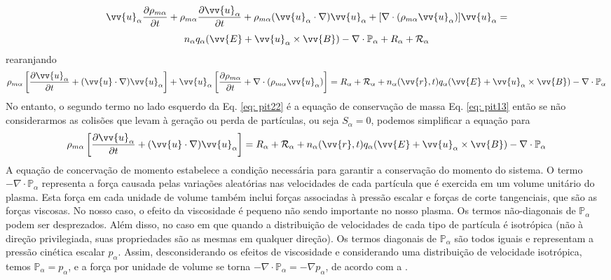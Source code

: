 \documentclass[12pt,oneside,a4paper]{abntex2}
\begin{document}
\begin{equation}
\label{eq: pit21}
 \vv{u}_\alpha \frac{\partial \rho_{m\alpha}}{\partial t} + \rho_{m\alpha} \frac{\partial \vv{u}_\alpha}{\partial t}+ \rho_{m\alpha} (\vv{u}_\alpha \cdot \nabla)\vv{u}_\alpha+[\nabla \cdot (\rho_{m\alpha} \vv{u}_\alpha)]\vv{u}_\alpha  =
\end{equation}
\begin{equation*}
n_\alpha q_\alpha (\vv{E} + \vv{u}_\alpha \times \vv{B})-\nabla \cdot \mathbb{P}_\alpha + R_\alpha + \mathcal{R}_\alpha
\end{equation*}
rearanjando
\begin{equation}
\label{eq: pit22}
\rho_{m\alpha} \left[\frac{\partial \vv{u}_\alpha}{\partial t} + (\vv{u} \cdot \nabla)\vv{u}_\alpha \right]+ \vv{u}_\alpha \left[ \frac{\partial \rho_{m\alpha}}{\partial t} + \nabla \cdot (\rho_{m\alpha} \vv{u}_\alpha)  \right] = R_\alpha + \mathcal{R}_\alpha +n_\alpha(\vv{r},t) q_\alpha (\vv{E} + \vv{u}_\alpha \times \vv{B})-\nabla \cdot \mathbb{P}_\alpha 
\end{equation}
No entanto, o segundo termo no lado esquerdo da Eq. \ref{eq: pit22} é a equação de conservação de massa Eq. \ref{eq: pit13} então se não considerarmos as colisões que levam à geração ou perda de partículas, ou seja $S_\alpha = 0$, podemos simplificar a equação para
\begin{equation}
\label{eq: pit23}
\rho_{m\alpha} \left[\frac{\partial \vv{u}_\alpha}{\partial t} + (\vv{u} \cdot \nabla)\vv{u}_\alpha \right] =  R_\alpha + \mathcal{R}_\alpha +n_\alpha(\vv{r},t) q_\alpha (\vv{E} + \vv{u}_\alpha \times \vv{B})-\nabla \cdot \mathbb{P}_\alpha 
\end{equation}
A equação de concervação de momento estabelece a condição necessária para garantir a conservação do momento do sistema. O termo $-\nabla \cdot \mathbb{P}_\alpha $ representa a força causada pelas variações aleatórias nas velocidades de cada partícula que é exercida em um volume unitário do plasma. Esta força em cada unidade de volume também inclui forças associadas à pressão escalar e forças de corte tangenciais, que são as forças viscosas. No nosso  caso, o efeito da viscosidade é pequeno não sendo importante no nosso plasma. Os termos não-diagonais de $\mathbb{P}_\alpha$ podem ser desprezados.  Além disso, no caso em que quando a distribuição de velocidades de cada tipo de partícula é isotrópica (não à direção privilegiada, suas propriedades são as mesmas em qualquer direção). Os termos diagonais de $\mathbb{P}_\alpha$ são todos iguais e representam a pressão cinética escalar $p_\alpha$. Assim, desconsiderando os efeitos de viscosidade e considerando uma distribuição de velocidade isotrópica, temos $\mathbb{P}_\alpha = p_\alpha$, e a força por unidade de volume se torna $-\nabla \cdot \mathbb{P}_\alpha = -\nabla p_\alpha$, de acordo com a \cite[Cap 6]{bittencourt}.
\end{document}
